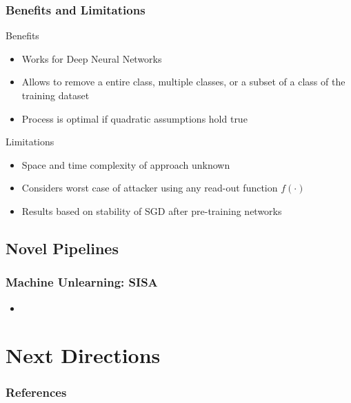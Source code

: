 \documentclass[pdf]{beamer}
\begin{document}
\begin{frame}
  \frametitle{Benefits and Limitations}
  \begin{block}{Benefits}
    \begin{itemize}
      \item Works for Deep Neural Networks
      \item Allows to remove a entire class, multiple classes, or a subset of a class of the training dataset
      \item Process is optimal if quadratic assumptions hold true
    \end{itemize}
  \end{block}

  \begin{alertblock}{Limitations}
    \begin{itemize}
      \item Space and time complexity of approach unknown
      \item Considers worst case of attacker using any read-out function $f(\cdot)$
      \item Results based on stability of SGD after pre-training networks
    \end{itemize}
  \end{alertblock}
\end{frame}

\subsection{Novel Pipelines}
\begin{frame}
  \myNset[4]
  \smartart
\end{frame}


\begin{frame}
  \frametitle{
    Machine Unlearning: SISA \cite{bourtouleMachineUnlearning2020}
    }
  \begin{itemize}
    \item 
  \end{itemize}
\end{frame}

\section{Next Directions}



\begin{frame}[allowframebreaks]
  \frametitle{References}
  
  
\end{frame}
\end{document}

